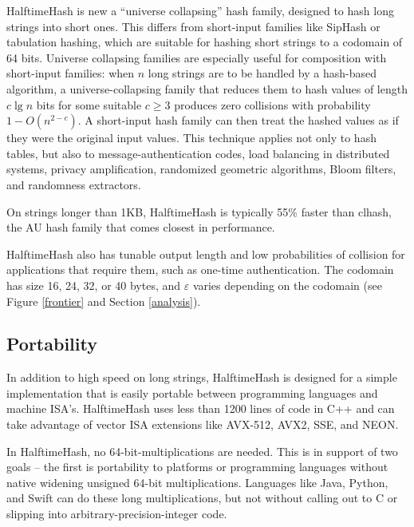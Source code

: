 \documentclass[runningheads]{llncs}
\begin{document}
HalftimeHash is new a ``universe collapsing'' hash family, designed to hash long strings into short ones. \cite{linear-hash-functions,hashing-without-primes-revisited,cuckoo-journal}
This differs from short-input families like SipHash or tabulation hashing, which are suitable for hashing short strings to a codomain of 64 bits. \cite{siphash,tabulation}
Universe collapsing families are especially useful for composition with short-input families: when $n$ long strings are to be handled by a hash-based algorithm, a universe-collapsing family that reduces them to hash values of length $c \lg n$ bits for some suitable $c \geq 3$ produces zero collisions with probability $1-O(n^{2-c})$.
A short-input hash family can then treat the hashed values as if they were the original input values. \cite{universe-collapse-linear-probing,siphash,tabulation,simple-hash-functions-work}
This technique applies not only to hash tables, but also to message-authentication codes, load balancing in distributed systems, privacy amplification, randomized geometric algorithms, Bloom filters, and randomness extractors. \cite{poly1305,chord,privacy-amplification,random-closest-pair,simple-hash-functions-work,fuzzy-extractors}

On strings longer than 1KB, HalftimeHash is typically 55\% faster than clhash, the AU hash family that comes closest in performance.

HalftimeHash also has tunable output length and low probabilities of collision for applications that require them, such as one-time authentication. \cite{nacl}
The codomain has size 16, 24, 32, or 40 bytes, and $\varepsilon$ varies depending on the codomain (see Figure \ref{frontier} and Section \ref{analysis}).

\subsection{Portability}

In addition to high speed on long strings, HalftimeHash is designed for a simple implementation that is easily portable between programming languages and machine ISA's.
HalftimeHash uses less than 1200 lines of code in C++ and can take advantage of vector ISA extensions like AVX-512, AVX2, SSE, and NEON.

In HalftimeHash, no 64-bit-mul\-ti\-pli\-ca\-tions are needed.
This is in support of two goals --
the first is portability to platforms or programming languages without native widening unsigned 64-bit multiplications.
Languages like Java, Python, and Swift can do these long multiplications, but not without calling out to C or slipping into arbitrary-precision-integer code.
\end{document}
